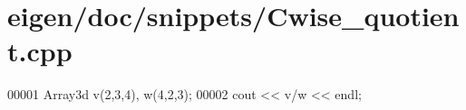 \hypertarget{eigen_2doc_2snippets_2_cwise__quotient_8cpp_source}{}\section{eigen/doc/snippets/\+Cwise\+\_\+quotient.cpp}
\label{eigen_2doc_2snippets_2_cwise__quotient_8cpp_source}

\begin{DoxyCode}
00001 Array3d v(2,3,4), w(4,2,3);
00002 cout << v/w << endl;
\end{DoxyCode}
